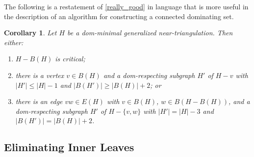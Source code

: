 \documentclass[a4paper,UKenglish, cleveref, autoref, thm-restate]{lipics-v2021}
\newtheorem{cor}{Corollary}
\begin{document}

The following is a restatement of \cref{really_good} in language that is more useful in the description of an algorithm for constructing a connected dominating set.

\begin{cor}\label{really_good_cor}
  Let $H$ be a dom-minimal generalized near-triangulation.  Then either:
  \begin{enumerate}[(1)]
    \item $H-B(H)$ is critical;
    \item there is a vertex $v\in B(H)$ and a dom-respecting subgraph $H'$ of  $H-v$ with $|H'|\le |H|-1$ and $|B(H')|\ge |B(H)|+2$; or
    \item there is an edge $vw\in E(H)$ with $v\in B(H)$, $w\in B(H-B(H))$, and a dom-respecting subgraph $H'$ of $H-\{v,w\}$ with $|H'|= |H|-3$ and $|B(H')|=|B(H)|+2$.
  \end{enumerate}
\end{cor}


\subsection{Eliminating Inner Leaves}
\label{one_kill_sec}
\end{document}
